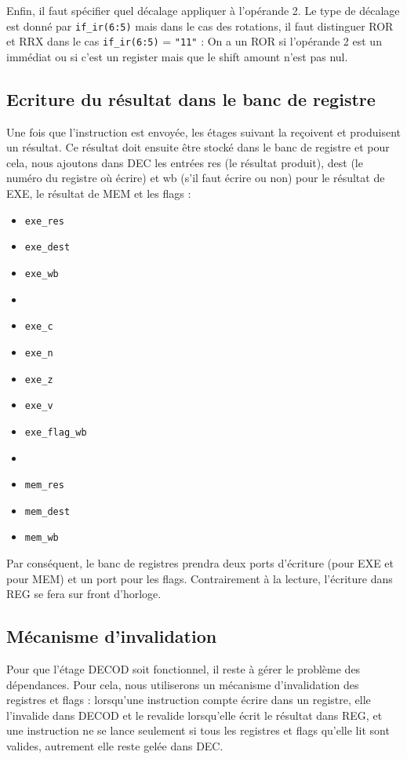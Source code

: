 \documentclass{article}
\begin{document}
Enfin, il faut spécifier quel décalage appliquer à l'opérande 2.
Le type de décalage est donné par \texttt{if\_ir(6:5)} mais dans le cas des rotations,
il faut distinguer ROR et RRX dans le cas \texttt{if\_ir(6:5)} = \texttt{"11"} :
On a un ROR si l'opérande 2 est un immédiat ou si c'est un register mais que le shift amount n'est pas nul.

\subsection{Ecriture du résultat dans le banc de registre}

Une fois que l'instruction est envoyée, les étages suivant la reçoivent et produisent un résultat.
Ce résultat doit ensuite être stocké dans le banc de registre et pour cela, nous ajoutons dans DEC
les entrées res (le résultat produit), dest (le numéro du registre où écrire) et wb (s'il faut écrire
ou non) pour le résultat de EXE, le résultat de MEM et les flags :

\begin{itemize}
 \item \texttt{exe\_res}
 \item \texttt{exe\_dest}
 \item \texttt{exe\_wb}
 \item
 \item \texttt{exe\_c}
 \item \texttt{exe\_n}
 \item \texttt{exe\_z}
 \item \texttt{exe\_v}
 \item \texttt{exe\_flag\_wb}
 \item
 \item \texttt{mem\_res}
 \item \texttt{mem\_dest}
 \item \texttt{mem\_wb}
\end{itemize}

Par conséquent, le banc de registres prendra deux ports d'écriture (pour EXE et pour MEM)
et un port pour les flags. Contrairement à la lecture, l'écriture dans REG se fera sur front d'horloge.

\subsection{Mécanisme d'invalidation}

Pour que l'étage DECOD soit fonctionnel, il reste à gérer le problème des dépendances.
Pour cela, nous utiliserons un mécanisme d'invalidation des registres et flags :
lorsqu'une instruction compte écrire dans un registre, elle l'invalide dans DECOD
et le revalide lorsqu'elle écrit le résultat dans REG, et une instruction ne se lance
seulement si tous les registres et flags qu'elle lit sont valides, autrement elle reste gelée dans DEC.
\end{document}
